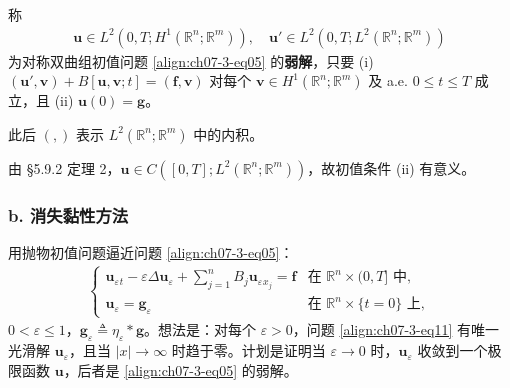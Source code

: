 \documentclass[../../main.tex]{subfiles}
\begin{document}
\begin{definition}\label{definition:ch07-3-弱解}
称
\begin{align*}
\mathbf{u}\in L^2(0,T;H^1(\mathbb{R}^n;\mathbb{R}^m)),\quad \mathbf{u}'\in L^2(0,T;L^2(\mathbb{R}^n;\mathbb{R}^m))
\end{align*}
为对称双曲组初值问题 \eqref{align:ch07-3-eq05} 的\textbf{弱解}，只要
(i) $(\mathbf{u}',\mathbf{v})+B[\mathbf{u},\mathbf{v};t]=(\mathbf{f},\mathbf{v})$ 对每个 $\mathbf{v}\in H^1(\mathbb{R}^n;\mathbb{R}^m)$ 及 a.e. $0\leqslant t\leqslant T$ 成立，且
(ii) $\mathbf{u}(0)=\mathbf{g}$。
\end{definition}

此后 $(,)$ 表示 $L^2(\mathbb{R}^n;\mathbb{R}^m)$ 中的内积。

\begin{remark}
由 \S5.9.2 定理 2，$\mathbf{u}\in C([0,T];L^2(\mathbb{R}^n;\mathbb{R}^m))$，故初值条件 (ii) 有意义。
\end{remark}

\subsubsection*{b. 消失黏性方法}\label{subsubsection:ch07-3-2-b-消失黏性}

用抛物初值问题逼近问题 \eqref{align:ch07-3-eq05}：
\begin{align}
\begin{cases}
\mathbf{u}_\varepsilon{}_t-\varepsilon\Delta\mathbf{u}_\varepsilon+\sum_{j=1}^n B_j\mathbf{u}_\varepsilon{}_{x_j}=\mathbf{f}&\text{在 }\mathbb{R}^n\times(0,T]\text{ 中},\\
\mathbf{u}_\varepsilon=\mathbf{g}_\varepsilon&\text{在 }\mathbb{R}^n\times\{t=0\}\text{ 上},
\end{cases}\label{align:ch07-3-eq11}
\end{align}
$0<\varepsilon\leqslant 1$，$\mathbf{g}_\varepsilon\triangleq\eta_\varepsilon*\mathbf{g}$。想法是：对每个 $\varepsilon>0$，问题 \eqref{align:ch07-3-eq11} 有唯一光滑解 $\mathbf{u}_\varepsilon$，且当 $|x|\to\infty$ 时趋于零。计划是证明当 $\varepsilon\to 0$ 时，$\mathbf{u}_\varepsilon$ 收敛到一个极限函数 $\mathbf{u}$，后者是 \eqref{align:ch07-3-eq05} 的弱解。
\end{document}
